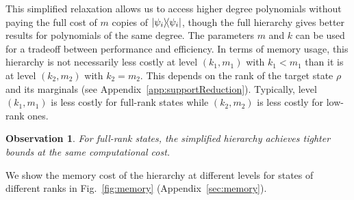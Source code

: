 \documentclass[11pt,a4paper]{report}
\newtheorem{observation}[theorem]{Observation}
\newcounter{reptag}
\newif\iftags \tagsfalse   %
\newcommand{\reptagbox}[3]{\iftags\par\smallskip\noindent\refstepcounter{reptag}%
  \fcolorbox{#1}{#1!7}{\parbox{\dimexpr\linewidth-2\fboxsep-2\fboxrule\relax}{\small
  \textcolor{#1}{\textbf{[\thereptag]\ #2.}}\ #3}}\par\smallskip\fi}
\newcommand{\detail}[1]{\reptagbox{tagD}{More detail}{#1}}
\begin{document}
This simplified relaxation allows us to access higher degree polynomials without paying the full cost of $m$ copies of $\dyad{\psi_i}$, though the full hierarchy gives better results for polynomials of the same degree.
The parameters $m$ and $k$ can be used for a tradeoff between performance and efficiency. In terms of memory usage, this hierarchy is not necessarily less costly at level $(k_1, m_1)$ with $k_1< m_1$ than it is at level $(k_2, m_2)$ with $k_2 = m_2$. This depends on the rank of the target state $\rho$ and its marginals (see Appendix~\ref{app:supportReduction}). Typically, level $(k_1, m_1)$ is less costly for full-rank states while $(k_2, m_2)$ is less costly for low-rank ones.

\detail{Explain the idea behind $\omega_{k,m}$ in two sentences: the objective only needs many copies of the marginals $\rho_{A,i}$, not of the full $\ket{\psi_i}$, so $k$ full copies tie the variable to $\rho$ and $m-k$ cheap marginal copies raise the degree.}
\begin{observation}
   For full-rank states, the simplified hierarchy achieves tighter bounds at the same computational cost.
\end{observation}
We show the memory cost of the hierarchy at different levels for states of different ranks in Fig.~\ref{fig:memory} (Appendix~\ref{sec:memory}).
\detail{The observation needs its evidence in the main text: one paragraph with the memory model (about $8n^2$ bytes, where the number $n$ of free variables depends only on $r$, $r_A=\operatorname{rank}\rho_A$ and the level) and its rule of thumb (the full hierarchy is cheaper when $r<(k+1)\,r_A-k$). The details and Fig.~\ref{fig:memory} stay in Appendix~\ref{sec:memory}.}

\end{document}
